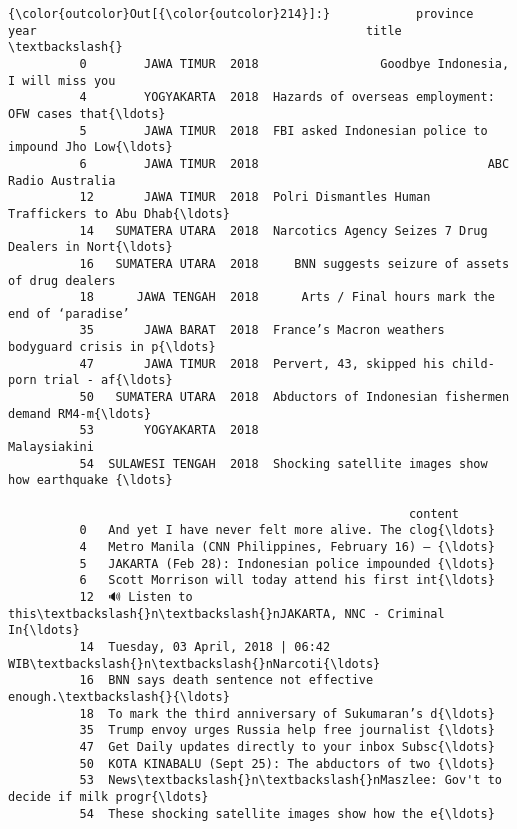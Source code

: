 \documentclass[11pt]{article}
\begin{document}
\begin{Verbatim}[commandchars=\\\{\}]
{\color{outcolor}Out[{\color{outcolor}214}]:}            province  year                                              title  \textbackslash{}
          0        JAWA TIMUR  2018                 Goodbye Indonesia, I will miss you   
          4        YOGYAKARTA  2018  Hazards of overseas employment: OFW cases that{\ldots}   
          5        JAWA TIMUR  2018  FBI asked Indonesian police to impound Jho Low{\ldots}   
          6        JAWA TIMUR  2018                                ABC Radio Australia   
          12       JAWA TIMUR  2018  Polri Dismantles Human Traffickers to Abu Dhab{\ldots}   
          14   SUMATERA UTARA  2018  Narcotics Agency Seizes 7 Drug Dealers in Nort{\ldots}   
          16   SUMATERA UTARA  2018     BNN suggests seizure of assets of drug dealers   
          18      JAWA TENGAH  2018      Arts / Final hours mark the end of ‘paradise’   
          35       JAWA BARAT  2018  France’s Macron weathers bodyguard crisis in p{\ldots}   
          47       JAWA TIMUR  2018  Pervert, 43, skipped his child-porn trial - af{\ldots}   
          50   SUMATERA UTARA  2018  Abductors of Indonesian fishermen demand RM4-m{\ldots}   
          53       YOGYAKARTA  2018                                       Malaysiakini   
          54  SULAWESI TENGAH  2018  Shocking satellite images show how earthquake {\ldots}   
          
                                                        content  
          0   And yet I have never felt more alive. The clog{\ldots}  
          4   Metro Manila (CNN Philippines, February 16) — {\ldots}  
          5   JAKARTA (Feb 28): Indonesian police impounded {\ldots}  
          6   Scott Morrison will today attend his first int{\ldots}  
          12  🔊 Listen to this\textbackslash{}n\textbackslash{}nJAKARTA, NNC - Criminal In{\ldots}  
          14  Tuesday, 03 April, 2018 | 06:42 WIB\textbackslash{}n\textbackslash{}nNarcoti{\ldots}  
          16  BNN says death sentence not effective enough.\textbackslash{}{\ldots}  
          18  To mark the third anniversary of Sukumaran’s d{\ldots}  
          35  Trump envoy urges Russia help free journalist {\ldots}  
          47  Get Daily updates directly to your inbox Subsc{\ldots}  
          50  KOTA KINABALU (Sept 25): The abductors of two {\ldots}  
          53  News\textbackslash{}n\textbackslash{}nMaszlee: Gov't to decide if milk progr{\ldots}  
          54  These shocking satellite images show how the e{\ldots}  
\end{Verbatim}
            
\end{document}
